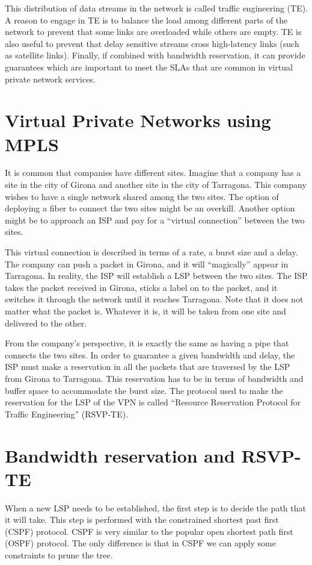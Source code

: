 This distribution of data streams in the network is called traffic engineering (TE).
A reason to engage in TE is to balance the load among different parts of the network to prevent that some links are overloaded while others are empty.
TE is also useful to prevent that delay sensitive streams cross high-latency links (such as satellite links).
Finally, if combined with bandwidth reservation, it can provide guarantees which are important to meet the SLAs that are common in virtual private network services.

\section{Virtual Private Networks using MPLS}
It is common that companies have different sites.
Imagine that a company has a site in the city of Girona and another site in the city of Tarragona.
This company wishes to have a single network shared among the two sites.
The option of deploying a fiber to connect the two sites might be an overkill.
Another option might be to approach an ISP and pay for a ``virtual connection'' between the two sites.

This virtual connection is described in terms of a rate, a burst size and a delay.
The company can push a packet in Girona, and it will ``magically'' appear in Tarragona.
In reality, the ISP will establish a LSP between the two sites.
The ISP takes the packet received in Girona, sticks a label on to the packet, and it switches it through the network until it reaches Tarragona.
Note that it does not matter what the packet is.
Whatever it is, it will be taken from one site and delivered to the other.

From the company's perspective, it is exactly the same as having a pipe that connects the two sites.
In order to guarantee a given bandwidth and delay, the ISP must make a reservation in all the packets that are traversed by the LSP from Girona to Tarragona.
This reservation has to be in terms of bandwidth and buffer space to accommodate the burst size.
The protocol used to make the reservation for the LSP of the VPN is called ``Resource Reservation Protocol for Traffic Engineering'' (RSVP-TE).


\section{Bandwidth reservation and RSVP-TE}
When a new LSP needs to be established, the first step is to decide the path that it will take.
This step is performed with the constrained shortest past first (CSPF) protocol.
CSPF is very similar to the popular open shortest path first (OSPF) protocol.
The only difference is that in CSPF we can apply some constraints to prune the tree.

